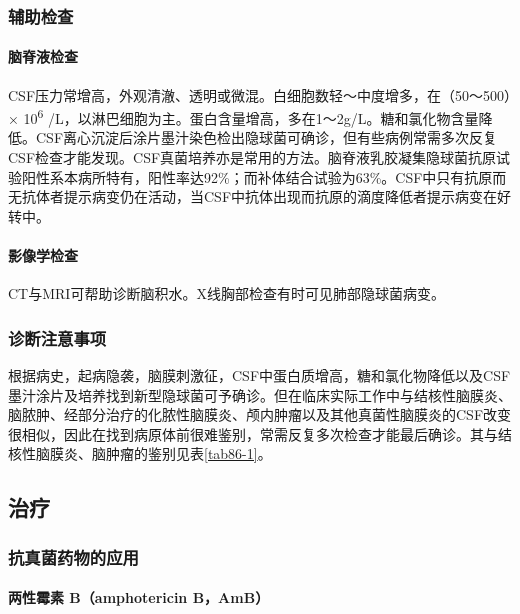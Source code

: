 \subsubsection{辅助检查}

\paragraph{脑脊液检查}

CSF压力常增高，外观清澈、透明或微混。白细胞数轻～中度增多，在（50～500）×
10\textsuperscript{6}
/L，以淋巴细胞为主。蛋白含量增高，多在1～2g/L。糖和氯化物含量降低。CSF离心沉淀后涂片墨汁染色检出隐球菌可确诊，但有些病例常需多次反复CSF检查才能发现。CSF真菌培养亦是常用的方法。脑脊液乳胶凝集隐球菌抗原试验阳性系本病所特有，阳性率达92\%；而补体结合试验为63\%。CSF中只有抗原而无抗体者提示病变仍在活动，当CSF中抗体出现而抗原的滴度降低者提示病变在好转中。

\paragraph{影像学检查}

CT与MRI可帮助诊断脑积水。X线胸部检查有时可见肺部隐球菌病变。

\subsubsection{诊断注意事项}

根据病史，起病隐袭，脑膜刺激征，CSF中蛋白质增高，糖和氯化物降低以及CSF墨汁涂片及培养找到新型隐球菌可予确诊。但在临床实际工作中与结核性脑膜炎、脑脓肿、经部分治疗的化脓性脑膜炎、颅内肿瘤以及其他真菌性脑膜炎的CSF改变很相似，因此在找到病原体前很难鉴别，常需反复多次检查才能最后确诊。其与结核性脑膜炎、脑肿瘤的鉴别见表\ref{tab86-1}。

\subsection{治疗}

\subsubsection{抗真菌药物的应用}

\paragraph{两性霉素 B（amphotericin B，AmB）}

